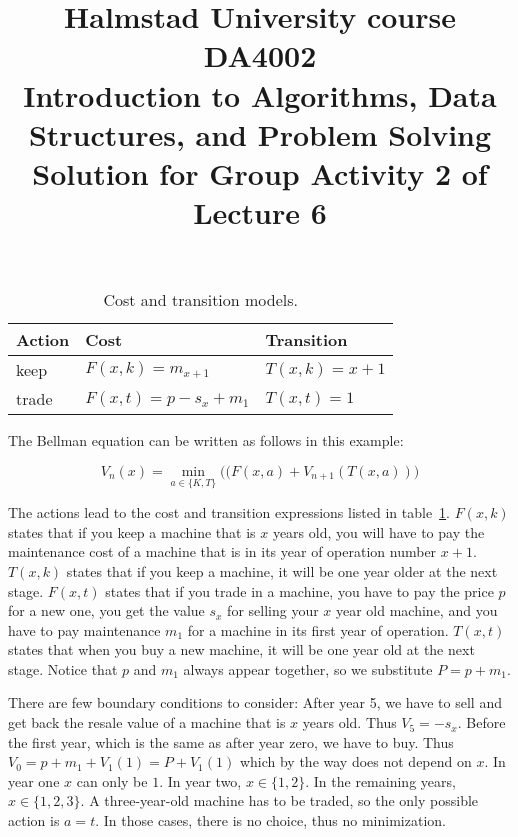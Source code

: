 \documentclass[a4paper]{article}
\begin{document}
\title{
  {\small
    Halmstad University course DA4002\\
    Introduction to Algorithms, Data Structures, and Problem Solving\\
  }
  Solution for Group Activity 2 of Lecture 6
}
\maketitle

\begin{table}
  \caption{Cost and transition models.}\label{tab:actions}
  \centering
  \begin{tabular}{lll}
    \toprule
    Action & Cost & Transition \\
    \midrule
    keep   & $F(x,k) = m_{x+1}$       & $T(x,k) = x+1$ \\
    trade  & $F(x,t) = p - s_x + m_1$ & $T(x,t) = 1$ \\
    \bottomrule
  \end{tabular}
\end{table}

The Bellman equation can be written as follows in this example:

\begin{equation}
  V_n(x) = \min_{a\in\{K,T\}} \big((F(x,a) + V_{n+1}(T(x,a)) \big)
\end{equation}

The actions lead to the cost and transition expressions listed in table~\ref{tab:actions}.
$F(x,k)$ states that if you keep a machine that is $x$ years old, you will have to pay the maintenance cost of a machine that is in its year of operation number $x+1$.
$T(x,k)$ states that if you keep a machine, it will be one year older at the next stage.
$F(x,t)$ states that if you trade in a machine, you have to pay the price $p$ for a new one, you get the value $s_x$ for selling your $x$ year old machine, and you have to pay maintenance $m_1$ for a machine in its first year of operation.
$T(x,t)$ states that when you buy a new machine, it will be one year old at the next stage.
Notice that $p$ and $m_1$ always appear together, so we substitute $P=p+m_1$.

There are few boundary conditions to consider:
After year 5, we have to sell and get back the resale value of a machine that is $x$ years old.
Thus $V_5 = -s_x$.
Before the first year, which is the same as after year zero, we have to buy.
Thus $V_0 = p + m_1 + V_1(1) = P + V_1(1)$ which by the way does not depend on $x$.
In year one $x$ can only be $1$.
In year two, $x\in\{1,2\}$.
In the remaining years, $x\in\{1,2,3\}$.
A three-year-old machine has to be traded, so the only possible action is $a=t$.
In those cases, there is no choice, thus no minimization.
\end{document}
